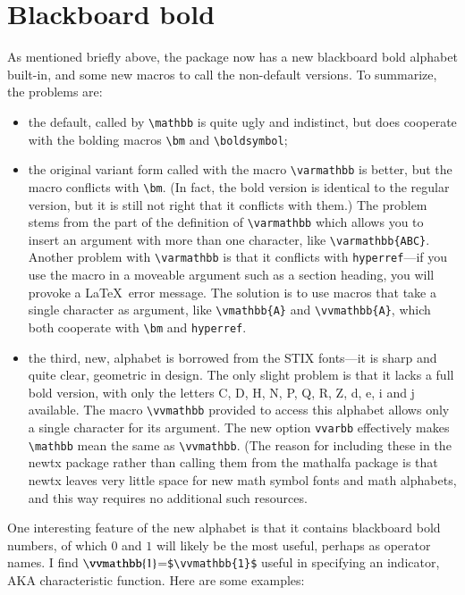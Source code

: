 \documentclass[11pt]{article}
\begin{document}
\section{Blackboard bold}
As mentioned briefly above, the package now has a new blackboard bold alphabet built-in, and some new macros to call the non-default versions. To summarize, the problems are:
\begin{itemize}
\item
the default, called by \verb|\mathbb| is quite ugly and indistinct, but does cooperate with the bolding macros \verb|\bm| and \verb|\boldsymbol|;
\item the original variant form called with the macro \verb|\varmathbb| is better, but the macro conflicts with \verb|\bm|. (In fact, the bold version is identical to the regular version, but it is still not right that it conflicts with them.) The problem stems from the part of the definition of \verb|\varmathbb| which allows you to insert an argument with more than one character, like \verb|\varmathbb{ABC}|. Another problem with \verb|\varmathbb| is that it conflicts with {\tt hyperref}---if you use the macro in a moveable argument such as a section heading, you will provoke a \LaTeX\ error message. The solution is to use macros that take a single character as argument, like \verb|\vmathbb{A}| and \verb|\vvmathbb{A}|, which both cooperate with \verb|\bm| and {\tt hyperref}.
\item the third, new, alphabet is borrowed from the STIX fonts---it is sharp and quite clear, geometric in design. The only slight problem is that it lacks a full bold version, with only the letters C, D, H, N, P, Q, R, Z, d, e, i and j available. The macro \verb|\vvmathbb| provided to access this alphabet allows only a single character for its argument. The new option {\tt vvarbb} effectively makes \verb|\mathbb| mean the same as \verb|\vvmathbb|.
(The reason for including these in the \textsf{newtx} package rather than calling them from the \textsf{mathalfa} package is that \textsf{newtx} leaves very little space for new math symbol fonts and math alphabets, and this way requires no additional such resources.
\end{itemize}
One interesting feature of the new alphabet is that it contains blackboard bold numbers, of which $0$ and $1$ will likely be the most useful, perhaps as operator names. I find $\vvmathbb{1}$=\verb|$\vvmathbb{1}$| useful in specifying an indicator, AKA characteristic function. Here are some examples:
\end{document}
